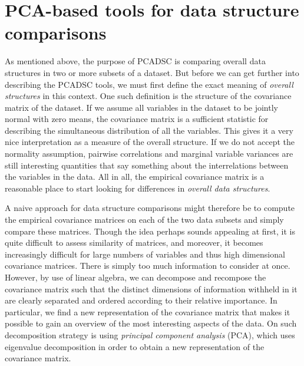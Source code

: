 \documentclass[titlepage,11pt,twoside]{article}
\begin{document}
\section{PCA-based tools for data structure comparisons}
\label{sec:pcadscintro}
As mentioned above, the purpose of PCADSC is comparing overall data structures in two or more subsets of a dataset. But before we can get further into describing the PCADSC tools, we must first define the exact meaning of \textit{overall structures} in this context. One such definition is the structure of the covariance matrix of the dataset. If we assume all variables in the dataset to be jointly normal with zero means, the covariance matrix is a sufficient statistic for describing the simultaneous distribution of all the variables. This gives it a very nice interpretation as a measure of the overall structure. If we do not accept the normality assumption, pairwise correlations and marginal variable variances are still interesting quantities that say something about the interrelations between the variables in the data. All in all, the empirical covariance matrix is a reasonable place to start looking for differences in \textit{overall data structures}.

A naive approach for data structure comparisons might therefore be to compute the empirical covariance matrices on each of the two data subsets and simply compare these matrices. Though the idea perhaps sounds appealing at first, it is quite difficult to assess similarity of matrices, and moreover, it becomes increasingly difficult for large numbers of variables and thus high dimensional covariance matrices. There is simply too much information to consider at once. However, by use of linear algebra, we can decompose and recompose the covariance matrix such that the distinct dimensions of information withheld in it are clearly separated and ordered according to their relative importance. In particular, we find a new representation of the covariance matrix that makes it possible to gain an overview of the most interesting aspects of the data. On such decomposition strategy is using \textit{principal component analysis} (PCA), which uses eigenvalue decomposition in order to obtain a new representation of the covariance matrix.
\end{document}
